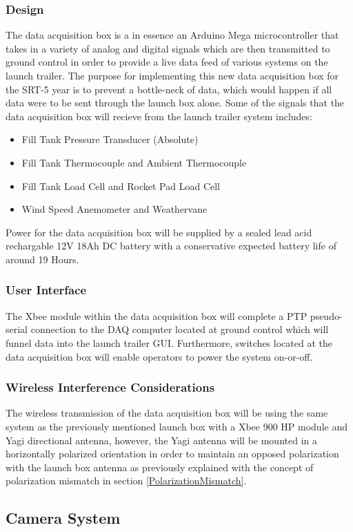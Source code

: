 \documentclass[10pt,a4paper]{article}
\begin{document}
\subsubsection{Design}
The data acquisition box is a in essence an Arduino Mega microcontroller that takes in a variety of analog and digital signals which are then transmitted to ground control in order to provide a live data feed of various systems on the launch trailer. The purpose for implementing this new data acquisition box for the SRT-5 year is to prevent a bottle-neck of data, which would happen if all data were to be sent through the launch box alone. Some of the signals that the data acquisition box will recieve from the launch trailer system includes:
\begin{itemize}
	\item Fill Tank Pressure Transducer (Absolute)
	\item Fill Tank Thermocouple and Ambient Thermocouple
	\item Fill Tank Load Cell and Rocket Pad Load Cell
	\item Wind Speed Anemometer and Weathervane
\end{itemize}
Power for the data acquisition box will be supplied by a sealed lead acid rechargable 12V 18Ah DC battery with a conservative expected battery life of around 19 Hours. 
\subsubsection{User Interface}
The Xbee module within the data acquisition box will complete a PTP pseudo-serial connection to the DAQ computer located at ground control which will funnel data into the launch trailer GUI. Furthermore, switches located at the data acquisition box will enable operators to power the system on-or-off.
\subsubsection{Wireless Interference Considerations}
The wireless transmission of the data acquisition box will be using the same system as the previously mentioned launch box with a Xbee 900 HP module and Yagi directional antenna, however, the Yagi antenna will be mounted in a horizontally polarized orientation in order to maintain an opposed polarization with the launch box antenna as previously explained with the concept of polarization mismatch in section \ref{PolarizationMismatch}.




\subsection{Camera System}
\end{document}
